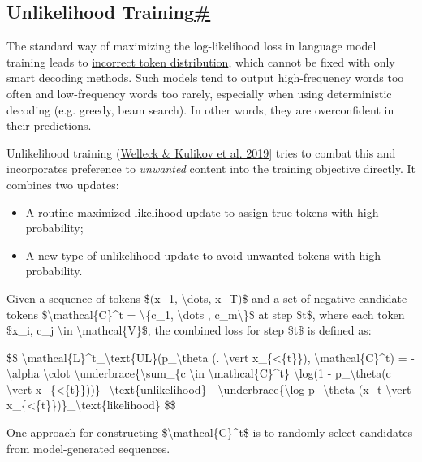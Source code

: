 \subsection{\texorpdfstring{Unlikelihood Training\hyperref[unlikelihood-training]{\#}}{Unlikelihood Training\#}}\label{unlikelihood-training}

The standard way of maximizing the log-likelihood loss in language model training leads to \hyperref[beam-search-surprise]{incorrect token distribution}, which cannot be fixed with only smart decoding methods. Such models tend to output high-frequency words too often and low-frequency words too rarely, especially when using deterministic decoding (e.g. greedy, beam search). In other words, they are overconfident in their predictions.

Unlikelihood training (\href{https://arxiv.org/abs/1908.04319}{Welleck \& Kulikov et al. 2019}{]} tries to combat this and incorporates preference to \emph{unwanted} content into the training objective directly. It combines two updates:

\begin{itemize}
\tightlist
\item
  A routine maximized likelihood update to assign true tokens with high probability;
\item
  A new type of unlikelihood update to avoid unwanted tokens with high probability.
\end{itemize}

Given a sequence of tokens \$(x\_1, \textbackslash dots, x\_T)\$ and a set of negative candidate tokens \$\textbackslash mathcal\{C\}\^{}t = \textbackslash\{c\_1, \textbackslash dots , c\_m\textbackslash\}\$ at step \$t\$, where each token \$x\_i, c\_j \textbackslash in \textbackslash mathcal\{V\}\$, the combined loss for step \$t\$ is defined as:

\$\$ \textbackslash mathcal\{L\}\^{}t\_\textbackslash text\{UL\}(p\_\textbackslash theta (. \textbackslash vert x\_\{\textless\{t\}\}), \textbackslash mathcal\{C\}\^{}t) = - \textbackslash alpha \textbackslash cdot \textbackslash underbrace\{\textbackslash sum\_\{c \textbackslash in \textbackslash mathcal\{C\}\^{}t\} \textbackslash log(1 - p\_\textbackslash theta(c \textbackslash vert x\_\{\textless\{t\}\}))\}\_\textbackslash text\{unlikelihood\} - \textbackslash underbrace\{\textbackslash log p\_\textbackslash theta (x\_t \textbackslash vert x\_\{\textless\{t\}\})\}\_\textbackslash text\{likelihood\} \$\$

One approach for constructing \$\textbackslash mathcal\{C\}\^{}t\$ is to randomly select candidates from model-generated sequences.

